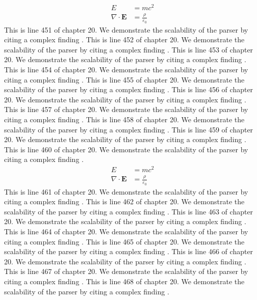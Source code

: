 \begin{align*}
  E &= mc^2 \\
  \nabla \cdot \mathbf{E} &= \frac{\rho}{\varepsilon_0}
\end{align*}
This is line 451 of chapter 20. We demonstrate the scalability of the parser by citing a complex finding \cite{ref20_451}.
This is line 452 of chapter 20. We demonstrate the scalability of the parser by citing a complex finding \cite{ref20_452}.
This is line 453 of chapter 20. We demonstrate the scalability of the parser by citing a complex finding \cite{ref20_453}.
This is line 454 of chapter 20. We demonstrate the scalability of the parser by citing a complex finding \cite{ref20_454}.
This is line 455 of chapter 20. We demonstrate the scalability of the parser by citing a complex finding \cite{ref20_455}.
This is line 456 of chapter 20. We demonstrate the scalability of the parser by citing a complex finding \cite{ref20_456}.
This is line 457 of chapter 20. We demonstrate the scalability of the parser by citing a complex finding \cite{ref20_457}.
This is line 458 of chapter 20. We demonstrate the scalability of the parser by citing a complex finding \cite{ref20_458}.
This is line 459 of chapter 20. We demonstrate the scalability of the parser by citing a complex finding \cite{ref20_459}.
This is line 460 of chapter 20. We demonstrate the scalability of the parser by citing a complex finding \cite{ref20_460}.
\begin{align*}
  E &= mc^2 \\
  \nabla \cdot \mathbf{E} &= \frac{\rho}{\varepsilon_0}
\end{align*}
This is line 461 of chapter 20. We demonstrate the scalability of the parser by citing a complex finding \cite{ref20_461}.
This is line 462 of chapter 20. We demonstrate the scalability of the parser by citing a complex finding \cite{ref20_462}.
This is line 463 of chapter 20. We demonstrate the scalability of the parser by citing a complex finding \cite{ref20_463}.
This is line 464 of chapter 20. We demonstrate the scalability of the parser by citing a complex finding \cite{ref20_464}.
This is line 465 of chapter 20. We demonstrate the scalability of the parser by citing a complex finding \cite{ref20_465}.
This is line 466 of chapter 20. We demonstrate the scalability of the parser by citing a complex finding \cite{ref20_466}.
This is line 467 of chapter 20. We demonstrate the scalability of the parser by citing a complex finding \cite{ref20_467}.
This is line 468 of chapter 20. We demonstrate the scalability of the parser by citing a complex finding \cite{ref20_468}.
